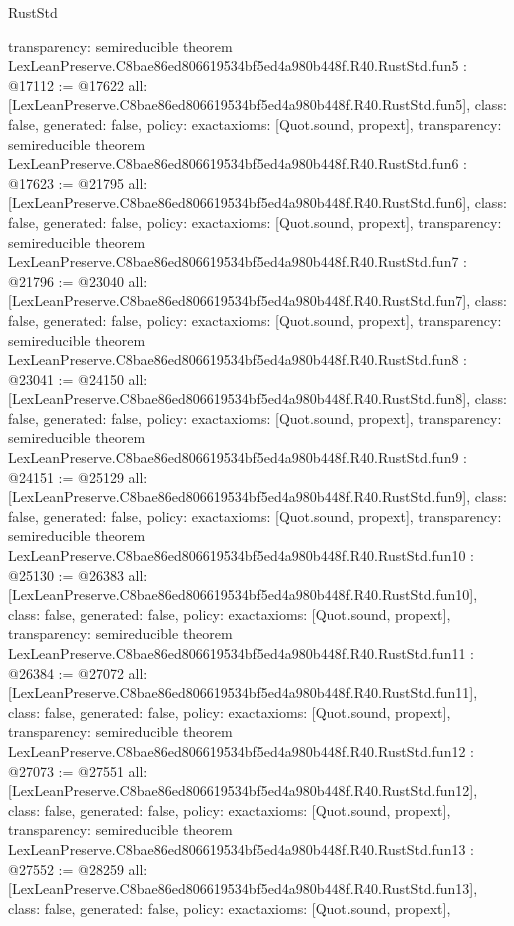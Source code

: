 \begin{lexlean}{RustStd}
\begin{coremodule}
{  transparency: semireducible
}
theorem LexLeanPreserve.C8bae86ed806619534bf5ed4a980b448f.R40.RustStd.fun5 : @17112 := @17622 {
  all: [LexLeanPreserve.C8bae86ed806619534bf5ed4a980b448f.R40.RustStd.fun5],
  class: false,
  generated: false,
  policy: exact{axioms: [Quot.sound, propext]},
  transparency: semireducible
}
theorem LexLeanPreserve.C8bae86ed806619534bf5ed4a980b448f.R40.RustStd.fun6 : @17623 := @21795 {
  all: [LexLeanPreserve.C8bae86ed806619534bf5ed4a980b448f.R40.RustStd.fun6],
  class: false,
  generated: false,
  policy: exact{axioms: [Quot.sound, propext]},
  transparency: semireducible
}
theorem LexLeanPreserve.C8bae86ed806619534bf5ed4a980b448f.R40.RustStd.fun7 : @21796 := @23040 {
  all: [LexLeanPreserve.C8bae86ed806619534bf5ed4a980b448f.R40.RustStd.fun7],
  class: false,
  generated: false,
  policy: exact{axioms: [Quot.sound, propext]},
  transparency: semireducible
}
theorem LexLeanPreserve.C8bae86ed806619534bf5ed4a980b448f.R40.RustStd.fun8 : @23041 := @24150 {
  all: [LexLeanPreserve.C8bae86ed806619534bf5ed4a980b448f.R40.RustStd.fun8],
  class: false,
  generated: false,
  policy: exact{axioms: [Quot.sound, propext]},
  transparency: semireducible
}
theorem LexLeanPreserve.C8bae86ed806619534bf5ed4a980b448f.R40.RustStd.fun9 : @24151 := @25129 {
  all: [LexLeanPreserve.C8bae86ed806619534bf5ed4a980b448f.R40.RustStd.fun9],
  class: false,
  generated: false,
  policy: exact{axioms: [Quot.sound, propext]},
  transparency: semireducible
}
theorem LexLeanPreserve.C8bae86ed806619534bf5ed4a980b448f.R40.RustStd.fun10 : @25130 := @26383 {
  all: [LexLeanPreserve.C8bae86ed806619534bf5ed4a980b448f.R40.RustStd.fun10],
  class: false,
  generated: false,
  policy: exact{axioms: [Quot.sound, propext]},
  transparency: semireducible
}
theorem LexLeanPreserve.C8bae86ed806619534bf5ed4a980b448f.R40.RustStd.fun11 : @26384 := @27072 {
  all: [LexLeanPreserve.C8bae86ed806619534bf5ed4a980b448f.R40.RustStd.fun11],
  class: false,
  generated: false,
  policy: exact{axioms: [Quot.sound, propext]},
  transparency: semireducible
}
theorem LexLeanPreserve.C8bae86ed806619534bf5ed4a980b448f.R40.RustStd.fun12 : @27073 := @27551 {
  all: [LexLeanPreserve.C8bae86ed806619534bf5ed4a980b448f.R40.RustStd.fun12],
  class: false,
  generated: false,
  policy: exact{axioms: [Quot.sound, propext]},
  transparency: semireducible
}
theorem LexLeanPreserve.C8bae86ed806619534bf5ed4a980b448f.R40.RustStd.fun13 : @27552 := @28259 {
  all: [LexLeanPreserve.C8bae86ed806619534bf5ed4a980b448f.R40.RustStd.fun13],
  class: false,
  generated: false,
  policy: exact{axioms: [Quot.sound, propext]},
}
\end{coremodule}
\end{lexlean}
